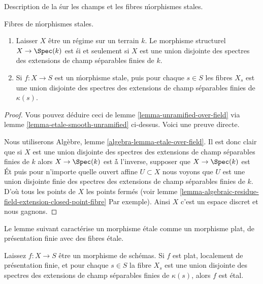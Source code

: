 \begin{lemma}

\label{lemma-etale-over-field}

\begin{slogan}

Description de la \'sur les champs et les fibres \'morphismes stales.

\end{slogan}

Fibres de \'morphismes stales.

\begin{enumerate}

\item Laisser $X$ être un régime sur un terrain $k$. Le morphisme structurel $X \to \Spec(k)$ est \'si et seulement si $X$ est une union disjointe des spectres des extensions de champ séparables finies de $k$.
\item Si $f : X \to S$ est un \'morphisme stale, puis pour chaque $s \in S$ les fibres $X_s$ est une union disjointe des spectres des extensions de champ séparables finies de $\kappa(s)$.

\end{enumerate}

\end{lemma}

\begin{proof}
Vous pouvez déduire ceci de lemme \ref{lemma-unramified-over-field} via lemme \ref{lemma-etale-smooth-unramified} ci-dessus. Voici une preuve directe.

\medskip\noindent

Nous utiliserons Algèbre, lemme \ref{algebra-lemma-etale-over-field}. Il est donc clair que si $X$ est une union disjointe des spectres des extensions de champ séparables finies de $k$ alors $X \to \Spec(k)$ est \'à l'inverse, supposer que $X \to \Spec(k)$ est \'Et puis pour n'importe quelle ouvert affine $U \subset X$ nous voyons que $U$ est une union disjointe finie des spectres des extensions de champ séparables finies de $k$. D'où tous les points de $X$
les points fermés (voir lemme \ref{lemma-algebraic-residue-field-extension-closed-point-fibre}
Par exemple). Ainsi $X$ c'est un espace discret et nous gagnons.

\end{proof}

\noindent
Le lemme suivant caractérise un morphisme \'etale comme un morphisme plat, de présentation finie avec des fibres \'etale.

\begin{lemma}

\label{lemma-etale-flat-etale-fibres}
Laissez $f : X \to S$ être un morphisme de schémas. Si $f$ est plat, localement de présentation finie, et pour chaque $s \in S$ la fibre $X_s$ est une union disjointe des spectres des extensions de champ séparables finies de $\kappa(s)$, alors $f$ est \'etal.
\end{lemma}

